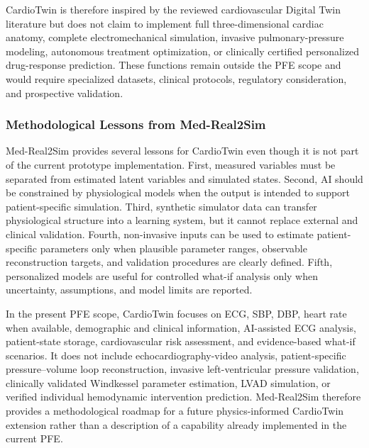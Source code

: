 CardioTwin is therefore inspired by the reviewed cardiovascular Digital Twin literature but does not claim to implement full three-dimensional cardiac anatomy, complete electromechanical simulation, invasive pulmonary-pressure modeling, autonomous treatment optimization, or clinically certified personalized drug-response prediction. These functions remain outside the PFE scope and would require specialized datasets, clinical protocols, regulatory consideration, and prospective validation.

\subsubsection{Methodological Lessons from Med-Real2Sim}
Med-Real2Sim provides several lessons for CardioTwin even though it is not part of the current prototype implementation. First, measured variables must be separated from estimated latent variables and simulated states. Second, AI should be constrained by physiological models when the output is intended to support patient-specific simulation. Third, synthetic simulator data can transfer physiological structure into a learning system, but it cannot replace external and clinical validation. Fourth, non-invasive inputs can be used to estimate patient-specific parameters only when plausible parameter ranges, observable reconstruction targets, and validation procedures are clearly defined. Fifth, personalized models are useful for controlled what-if analysis only when uncertainty, assumptions, and model limits are reported.

In the present PFE scope, CardioTwin focuses on ECG, SBP, DBP, heart rate when available, demographic and clinical information, AI-assisted ECG analysis, patient-state storage, cardiovascular risk assessment, and evidence-based what-if scenarios. It does not include echocardiography-video analysis, patient-specific pressure--volume loop reconstruction, invasive left-ventricular pressure validation, clinically validated Windkessel parameter estimation, LVAD simulation, or verified individual hemodynamic intervention prediction. Med-Real2Sim therefore provides a methodological roadmap for a future physics-informed CardioTwin extension rather than a description of a capability already implemented in the current PFE.

